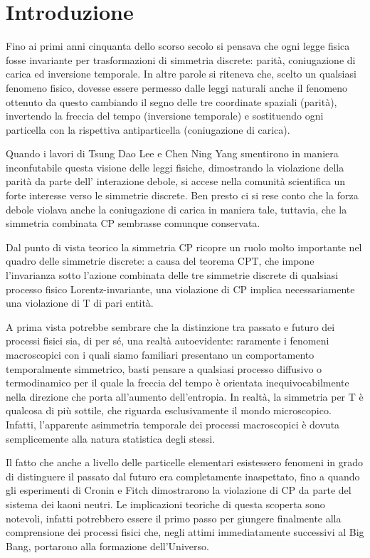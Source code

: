 \chapter*{Introduzione}
\noindent
Fino ai primi anni cinquanta dello scorso secolo si pensava che ogni legge fisica fosse invariante per trasformazioni di simmetria discrete: parità, coniugazione di carica ed inversione temporale.
In altre parole si riteneva che, scelto un qualsiasi fenomeno fisico, dovesse essere permesso dalle leggi naturali anche il fenomeno ottenuto da questo cambiando il segno delle tre coordinate spaziali (parità), invertendo la freccia del tempo (inversione temporale) e sostituendo ogni particella con la rispettiva antiparticella (coniugazione di carica).

Quando i lavori di Tsung Dao Lee e Chen Ning Yang smentirono in maniera inconfutabile questa visione delle leggi fisiche, dimostrando la violazione della parità da parte dell' interazione debole, si accese nella comunità scientifica un forte interesse verso le simmetrie discrete.
Ben presto ci si rese conto che la forza debole violava anche la coniugazione di carica  in maniera tale, tuttavia, che la simmetria combinata CP sembrasse comunque conservata.

Dal punto di vista teorico la simmetria CP ricopre un ruolo molto importante nel quadro delle simmetrie discrete: a causa del teorema CPT, che impone l'invarianza sotto l'azione combinata delle tre simmetrie discrete di qualsiasi processo fisico  Lorentz-invariante, una violazione di CP  implica necessariamente una violazione di T di pari entità. 

A prima vista potrebbe sembrare che la distinzione tra passato e futuro dei processi fisici sia, di per sé, una realtà autoevidente: raramente i fenomeni macroscopici con i quali siamo familiari presentano un comportamento temporalmente simmetrico, basti pensare a qualsiasi processo diffusivo o termodinamico per il quale la freccia del tempo è orientata inequivocabilmente nella direzione che porta all'aumento dell'entropia.
In realtà, la simmetria per T è qualcosa di più sottile, che riguarda esclusivamente il mondo microscopico. Infatti, l'apparente asimmetria temporale dei processi macroscopici è dovuta semplicemente alla natura statistica degli stessi. 

Il fatto che anche a livello delle particelle elementari esistessero fenomeni in grado di distinguere il passato dal futuro era completamente inaspettato, fino a quando gli esperimenti di  Cronin e Fitch
 dimostrarono la violazione di CP da parte del sistema dei kaoni neutri. Le implicazioni teoriche di questa scoperta sono notevoli, infatti potrebbero essere il primo passo per giungere finalmente alla comprensione dei processi fisici che, negli attimi immediatamente successivi al Big Bang, portarono alla formazione dell'Universo. 

